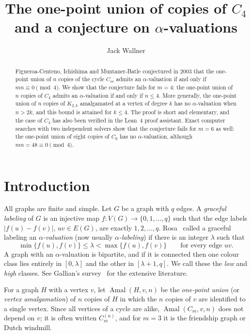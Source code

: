 \documentclass[11pt]{amsart}
\title[One-point unions of $C_4$ and $\alpha$-valuations]{The one-point union of copies of $C_4$\\ and a conjecture on $\alpha$-valuations}
\author{Jack Wallner}
\theoremstyle{definition}
\theoremstyle{remark}
\newcommand{\Amal}{\operatorname{Amal}}
\begin{document}
\begin{abstract}
Figueroa-Centeno, Ichishima and Muntaner-Batle conjectured in 2003 that the one-point union of $n$ copies of the cycle $C_m$ admits an $\alpha$-valuation if and only if $mn \equiv 0 \pmod 4$. We show that the conjecture fails for $m = 4$: the one-point union of $n$ copies of $C_4$ admits an $\alpha$-valuation if and only if $n \le 4$. More generally, the one-point union of $n$ copies of $K_{2,k}$ amalgamated at a vertex of degree $k$ has no $\alpha$-valuation when $n > 2k$, and this bound is attained for $k \le 4$. The proof is short and elementary, and the case of $C_4$ has also been verified in the Lean~4 proof assistant. Exact computer searches with two independent solvers show that the conjecture fails for $m = 6$ as well: the one-point union of eight copies of $C_6$ has no $\alpha$-valuation, although $mn = 48 \equiv 0 \pmod 4$.
\end{abstract}

\maketitle

\section{Introduction}

All graphs are finite and simple. Let $G$ be a graph with $q$ edges. A \emph{graceful labeling} of $G$ is an injective map $f\colon V(G)\to\{0,1,\dots,q\}$ such that the edge labels $|f(u)-f(v)|$, $uv \in E(G)$, are exactly $1,2,\dots,q$. Rosa~\cite{Rosa} called a graceful labeling an \emph{$\alpha$-valuation} (now usually \emph{$\alpha$-labeling}) if there is an integer $\lambda$ such that
\[
  \min\{f(u),f(v)\} \le \lambda < \max\{f(u),f(v)\} \qquad\text{for every edge } uv.
\]
A graph with an $\alpha$-valuation is bipartite, and if it is connected then one colour class lies entirely in $[0,\lambda]$ and the other in $[\lambda+1,q]$. We call these the \emph{low} and \emph{high} classes. See Gallian's survey~\cite{Gallian} for the extensive literature.

For a graph $H$ with a vertex $v$, let $\Amal(H,v,n)$ be the \emph{one-point union} (or \emph{vertex amalgamation}) of $n$ copies of $H$ in which the $n$ copies of $v$ are identified to a single vertex. Since all vertices of a cycle are alike, $\Amal(C_m,v,n)$ does not depend on $v$; it is often written $C_m^{(n)}$, and for $m=3$ it is the friendship graph or Dutch windmill.
\end{document}
